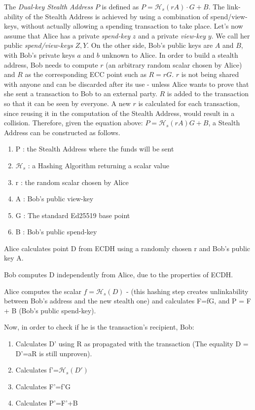 The \textit{Dual-key Stealth Address} $P$ is defined as $P=\mathcal{H}_s(rA) \cdot G+B$. The link-ability of the Stealth Address is achieved by using a combination of spend/view-keys, without actually allowing a spending transaction to take place. Let's now assume that Alice has a private \textit{spend-key} $z$ and a private \textit{view-key} $y$. We call her public \textit{spend/view-keys} $Z,Y$. On the other side, Bob's public keys are $A$ and $B$, with Bob's private keys $a$ and $b$ unknown to Alice. In order to build a stealth address, Bob needs to compute $r$ (an arbitrary random scalar chosen by Alice) and $R$ as the corresponding ECC point such as $R=rG$. $r$ is not being shared with anyone and can be discarded after its use - unless Alice wants to prove that she sent a transaction to Bob to an external party. $R$ is added to the transaction so that it can be seen by everyone. A new $r$ is calculated for each transaction, since reusing it in the computation of the Stealth Address, would result in a collision. Therefore, given the equation above: $P=\mathcal{H}_s(rA)G+B$, a Stealth Address can be constructed as follows.

\begin{enumerate}
\item P : the Stealth Address where the funds will be sent
\item $\mathcal{H}_s$ : a Hashing Algorithm returning a scalar value
\item r : the random scalar chosen by Alice
\item A : Bob's public view-key
\item G : The standard Ed25519 base point
\item B : Bob's public spend-key
\end{enumerate}

Alice calculates point D from ECDH using a randomly chosen r and Bob's public key A.

Bob computes D independently from Alice, due to the properties of ECDH.

Alice computes the scalar $f=\mathcal{H}_s(D)$ - (this hashing step creates unlinkability between Bob's address and the new stealth one) and calculates F=fG, and P = F + B (Bob's public spend-key).

Now, in order to check if he is the transaction's recipient, Bob:

\begin{enumerate}
\item Calculates D' using R as propagated with the transaction (The equality D = D'=aR is still unproven).
\item Calculates f'=$\mathcal{H}_s(D')$
\item Calculates F'=f'G
\item Calculates P'=F'+B
\end{enumerate}

